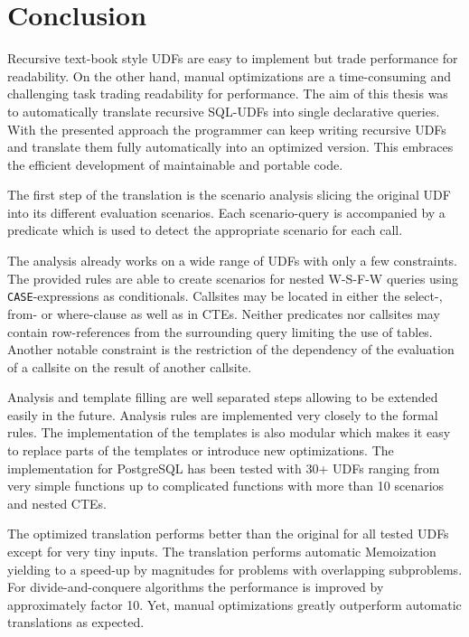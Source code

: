 \chapter{Conclusion} \label{conclusion}



Recursive text-book style UDFs are easy to implement but trade performance for readability. On the other hand, manual optimizations are a time-consuming and challenging task trading readability for performance. The aim of this thesis was to automatically translate recursive SQL-UDFs into single declarative queries.  With the presented approach the programmer can keep writing recursive UDFs and translate them fully automatically into an optimized version. This embraces the efficient development of maintainable and portable code.

The first step of the translation is the scenario analysis slicing the original UDF into its different evaluation scenarios. Each scenario-query is accompanied by a predicate which is used to detect the appropriate scenario for each call.

The analysis already works on a wide range of UDFs with only a few constraints. The provided rules are able to create scenarios for nested W-S-F-W queries using \texttt{CASE}-expressions as conditionals. Callsites may be located in either the select-, from- or where-clause as well as in CTEs. Neither predicates nor callsites may contain row-references from the surrounding query limiting the use of tables. Another notable constraint is the restriction of the dependency of the evaluation of a callsite on the result of another callsite. 

Analysis and template filling are well separated steps allowing to be extended easily in the future. Analysis rules are implemented very closely to the formal rules. The implementation of the templates is also modular which makes it easy to replace parts of the templates or introduce new optimizations. The implementation for PostgreSQL has been tested with 30+ UDFs ranging from very simple functions up to complicated functions with more than 10 scenarios and nested CTEs.

The optimized translation performs better than the original for all tested UDFs except for very tiny inputs. The translation performs automatic Memoization yielding to a speed-up by magnitudes for problems with overlapping subproblems. For divide-and-conquere algorithms the performance is improved by approximately factor 10. Yet, manual optimizations greatly outperform automatic translations as expected.

